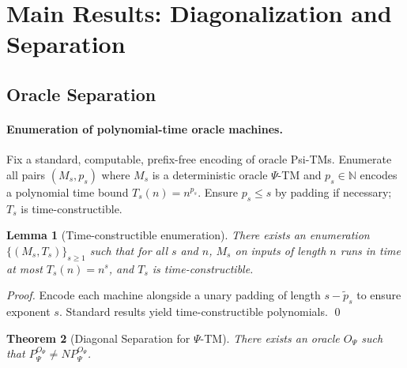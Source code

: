 \documentclass[11pt]{article}
\newtheorem{theorem}{Theorem}[section]
\newtheorem{lemma}[theorem]{Lemma}
\theoremstyle{definition}
\newcommand{\PSi}{\Psi}
\begin{document}
\section{Main Results: Diagonalization and Separation}

\subsection{Oracle Separation}

\paragraph{Enumeration of polynomial-time oracle machines.}
Fix a standard, computable, prefix-free encoding of oracle Psi-TMs. Enumerate all pairs $(M_s, p_s)$ where $M_s$ is a deterministic oracle $\PSi$-TM and $p_s\in\mathbb{N}$ encodes a polynomial time bound $T_s(n)=n^{p_s}$. Ensure $p_s\le s$ by padding if necessary; $T_s$ is time-constructible.

\begin{lemma}[Time-constructible enumeration]
\label{lem:enum}
There exists an enumeration $\{(M_s,T_s)\}_{s\ge1}$ such that for all $s$ and $n$, $M_s$ on inputs of length $n$ runs in time at most $T_s(n)=n^{s}$, and $T_s$ is time-constructible.
\end{lemma}
\begin{proof}
Encode each machine alongside a unary padding of length $s-\tilde p_s$ to ensure exponent $s$. Standard results yield time-constructible polynomials. \qed
\end{proof}

\begin{theorem}[Diagonal Separation for $\PSi$-TM]
\label{thm:diagonal}
There exists an oracle $O_\PSi$ such that $P^{O_\PSi}_\PSi \neq NP^{O_\PSi}_\PSi$.
\end{theorem}
\end{document}
